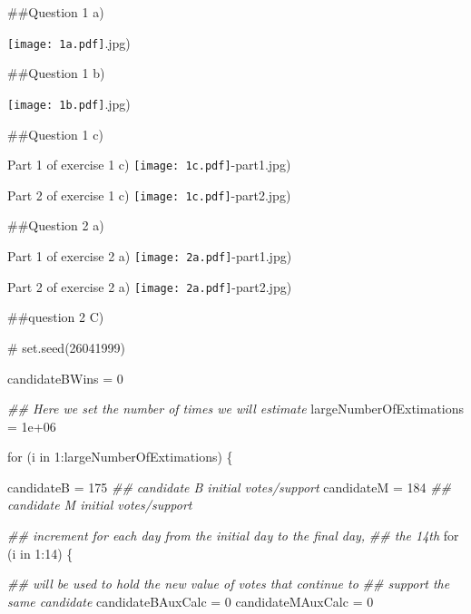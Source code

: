 \documentclass[
  a4paper,
  DIV=11,
  numbers=noendperiod]{scrartcl}
\newenvironment{Shaded}{\begin{snugshade}}{\end{snugshade}}
\newcommand{\CommentTok}[1]{\textcolor[rgb]{0.37,0.37,0.37}{#1}}
\newcommand{\ControlFlowTok}[1]{\textcolor[rgb]{0.00,0.23,0.31}{#1}}
\newcommand{\DecValTok}[1]{\textcolor[rgb]{0.68,0.00,0.00}{#1}}
\newcommand{\DocumentationTok}[1]{\textcolor[rgb]{0.37,0.37,0.37}{\textit{#1}}}
\newcommand{\FloatTok}[1]{\textcolor[rgb]{0.68,0.00,0.00}{#1}}
\newcommand{\NormalTok}[1]{\textcolor[rgb]{0.00,0.23,0.31}{#1}}
\newcommand{\OtherTok}[1]{\textcolor[rgb]{0.00,0.23,0.31}{#1}}
\newcommand{\SpecialCharTok}[1]{\textcolor[rgb]{0.37,0.37,0.37}{#1}}
\begin{document}
\#\#Question 1 a)

\texttt{[image: 1a.pdf]}.jpg)

\#\#Question 1 b)

\texttt{[image: 1b.pdf]}.jpg)

\#\#Question 1 c)

Part 1 of exercise 1 c) \texttt{[image: 1c.pdf]}-part1.jpg)

Part 2 of exercise 1 c) \texttt{[image: 1c.pdf]}-part2.jpg)

\#\#Question 2 a)

Part 1 of exercise 2 a) \texttt{[image: 2a.pdf]}-part1.jpg)

Part 2 of exercise 2 a) \texttt{[image: 2a.pdf]}-part2.jpg)

\#\#question 2 C)

\begin{Shaded}
\begin{Highlighting}[]
\CommentTok{\# set.seed(26041999)}

\NormalTok{candidateBWins }\OtherTok{=} \DecValTok{0}

\DocumentationTok{\#\# Here we set the number of times we will estimate}
\NormalTok{largeNumberOfExtimations }\OtherTok{=} \FloatTok{1e+06}

\ControlFlowTok{for}\NormalTok{ (i }\ControlFlowTok{in} \DecValTok{1}\SpecialCharTok{:}\NormalTok{largeNumberOfExtimations) \{}

\NormalTok{    candidateB }\OtherTok{=} \DecValTok{175}  \DocumentationTok{\#\# candidate B initial votes/support}
\NormalTok{    candidateM }\OtherTok{=} \DecValTok{184}  \DocumentationTok{\#\# candidate M initial votes/support}

    \DocumentationTok{\#\# increment for each day from the initial day to the final day,}
    \DocumentationTok{\#\# the 14th}
    \ControlFlowTok{for}\NormalTok{ (i }\ControlFlowTok{in} \DecValTok{1}\SpecialCharTok{:}\DecValTok{14}\NormalTok{) \{}

        \DocumentationTok{\#\# will be used to hold the new value of votes that continue to}
        \DocumentationTok{\#\# support the same candidate}
\NormalTok{        candidateBAuxCalc }\OtherTok{=} \DecValTok{0}
\NormalTok{        candidateMAuxCalc }\OtherTok{=} \DecValTok{0}


\end{Highlighting}
\end{Shaded}
\end{document}
